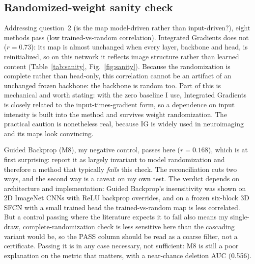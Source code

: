 \documentclass[11pt]{article}
\begin{document}
\subsection{Randomized-weight sanity check}
\label{sec:sanity}
Addressing question~2 (is the map model-driven rather than input-driven?),
eight methods pass (low trained-vs-random correlation). Integrated Gradients does not
($r=0.73$): its map is almost unchanged when every layer, backbone and head, is reinitialized,
so on this network it reflects image structure rather than learned content
(Table~\ref{tab:sanity}, Fig.~\ref{fig:sanity}). Because the randomization is complete rather
than head-only, this correlation cannot be an artifact of an unchanged frozen backbone: the
backbone is random too. Part of this is mechanical and worth stating: with the zero baseline I
use, Integrated Gradients is closely related to the input-times-gradient form, so a dependence on input
intensity is built into the method and survives weight randomization. The practical caution is
nonetheless real, because IG is widely used in neuroimaging \citep{eitel2019} and its maps look
convincing.

Guided Backprop (M8), my negative control, passes here ($r=0.168$), which is at first
surprising: \citet{adebayo2018} report it as largely invariant to model randomization and
therefore a method that typically \emph{fails} this check. The reconciliation cuts two ways,
and the second way is a caveat on my own test. The verdict depends on architecture and
implementation: Guided Backprop's insensitivity was shown on 2D ImageNet CNNs with ReLU
backprop overrides, and on a frozen six-block 3D SFCN with a small trained head the
trained-vs-random map is less correlated. But a control passing where the literature expects it
to fail also means my single-draw, complete-randomization check is less sensitive here than
the cascading variant would be, so the PASS column should be read as a coarse filter, not a
certificate. Passing it is in any case necessary, not sufficient: M8 is still a poor explanation
on the metric that matters, with a near-chance deletion AUC (0.556).
\end{document}
